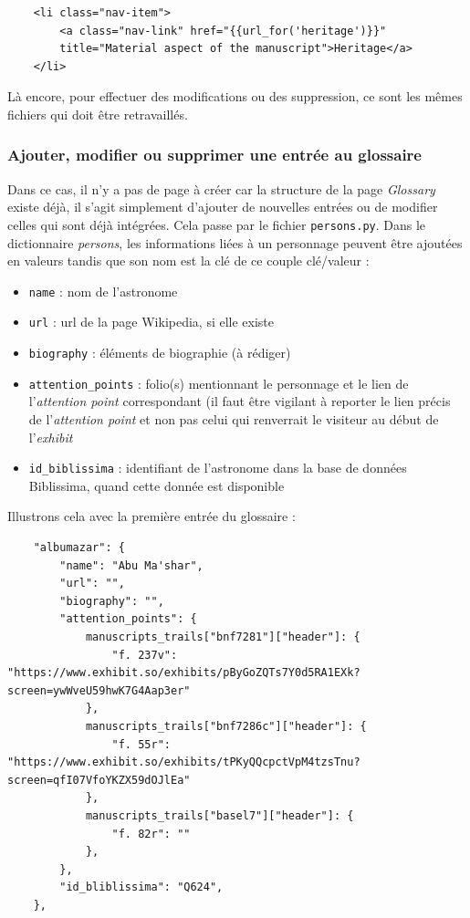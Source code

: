     \begin{verbatim}
    <li class="nav-item">
        <a class="nav-link" href="{{url_for('heritage')}}" 
        title="Material aspect of the manuscript">Heritage</a>
    </li>
    \end{verbatim}
    
    Là encore, pour effectuer des modifications ou des suppression, ce sont les mêmes fichiers qui doit être retravaillés. 
    
    \subsubsection{Ajouter, modifier ou supprimer une entrée au glossaire}
    Dans ce cas, il n'y a pas de page à créer car la structure de la page \textit{Glossary} existe déjà, il s'agit simplement d'ajouter de nouvelles entrées ou de modifier celles qui sont déjà intégrées. Cela passe par le fichier \texttt{persons.py}. Dans le dictionnaire \textit{persons}, les informations liées à un personnage peuvent être ajoutées en valeurs tandis que son nom est la clé de ce couple clé/valeur :
    
    \begin{itemize}
        \item \texttt{name} : nom de l'astronome 
        \item \texttt{url} : \acrshort{url} de la page Wikipedia, si elle existe
        \item \texttt{biography} : éléments de biographie (à rédiger)
        \item \texttt{attention\_points} : folio(s) mentionnant le personnage et le lien de l'\textit{attention point} correspondant (il faut être vigilant à reporter le lien précis de l'\textit{attention point} et non pas celui qui renverrait le visiteur au début de l'\textit{exhibit}
        \item \texttt{id\_biblissima} : identifiant de l'astronome dans la base de données Biblissima, quand cette donnée est disponible
    \end{itemize}
    
    
    Illustrons cela avec la première entrée du glossaire : 
    \begin{verbatim}
    "albumazar": {
        "name": "Abu Ma'shar",
        "url": "",
        "biography": "",
        "attention_points": {
            manuscripts_trails["bnf7281"]["header"]: {
                "f. 237v": "https://www.exhibit.so/exhibits/pByGoZQTs7Y0d5RA1EXk?screen=ywWveU59hwK7G4Aap3er"
            },
            manuscripts_trails["bnf7286c"]["header"]: {
                "f. 55r": "https://www.exhibit.so/exhibits/tPKyQQcpctVpM4tzsTnu?screen=qfI07VfoYKZX59dOJlEa"
            },
            manuscripts_trails["basel7"]["header"]: {
                "f. 82r": ""
            },
        },
        "id_bliblissima": "Q624",
    },
    \end{verbatim}
    
